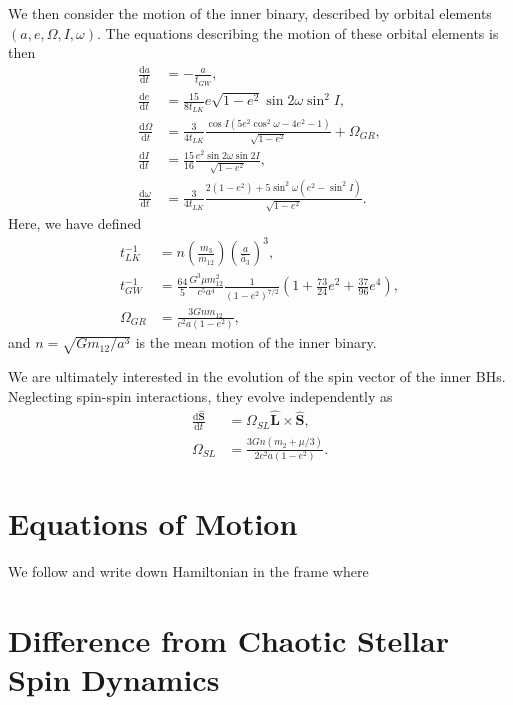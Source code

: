 \documentclass[
        fleqn,
        usenatbib,
    ]{mnras}
\newcommand*{\rd}[2]{\frac{\mathrm{d}#1}{\mathrm{d}#2}}
\newcommand*{\bm}[1]{\boldsymbol{\mathbf{#1}}}
\newcommand*{\p}[1]{\left(#1\right)}
\begin{document}
We then consider the motion of the inner binary, described by orbital elements
$(a, e, \Omega, I, \omega)$. The equations describing the motion of these
orbital elements is then \citep{storch,bin2,peters1964}
\begin{align}
    \rd{a}{t} &= -\frac{a}{t_{GW}},\\
    \rd{e}{t} &= \frac{15}{8t_{LK}} e\sqrt{1 - e^2}\sin 2\omega
        \sin^2 I,\\
    \rd{\Omega}{t} &= \frac{3}{4t_{LK}}
        \frac{\cos I\p{5e^2 \cos^2\omega - 4e^2 - 1}}{\sqrt{1 - e^2}}
        + \Omega_{GR},\\
    \rd{I}{t} &= \frac{15}{16}\frac{e^2\sin 2\omega \sin 2I}{
        \sqrt{1 - e^2}},\\
    \rd{\omega}{t} &= \frac{3}{4t_{LK}}
        \frac{2\p{1 - e^2} + 5\sin^2\omega
            (e^2 - \sin^2 I)}{\sqrt{1 - e^2}}.
\end{align}
Here, we have defined
\begin{align}
    t_{LK}^{-1} &= n\p{\frac{m_3}{m_{12}}}\p{\frac{a}{\bar{a}_3}}^3,\\
    t_{GW}^{-1} &= \frac{64}{5}\frac{G^3 \mu m_{12}^2}{c^5a^4}
        \frac{1}{\p{1 - e^2}^{7/2}}\p{1 + \frac{73}{24}e^2
            + \frac{37}{96}e^4},\\
    \Omega_{GR} &= \frac{3Gnm_{12}}{c^2a\p{1 - e^2}},
\end{align}
and $n = \sqrt{Gm_{12}/a^3}$ is the mean motion of the inner binary.

We are ultimately interested in the evolution of the spin vector of the inner
BHs. Neglecting spin-spin interactions, they evolve independently as
\begin{align}
    \rd{\hat{\bm{S}}}{t} &= \Omega_{SL}\hat{\bm{L}} \times \hat{\bm{S}},\\
    \Omega_{SL} &= \frac{3Gn\p{m_2 + \mu/3}}{2c^2a\p{1 - e^2}}.
\end{align}

\appendix

\section{Equations of Motion}

We follow \citet{kinoshita,storch} and write down Hamiltonian in the frame where

\section{Difference from Chaotic Stellar Spin Dynamics}
\end{document}
